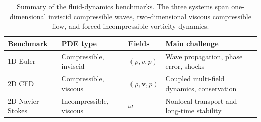 \documentclass[11pt]{article}
\begin{document}
\begin{table}[t]
\small
    \centering
    \caption{
    Summary of the fluid-dynamics benchmarks.
    The three systems span one-dimensional inviscid compressible waves,
    two-dimensional viscous compressible flow, and forced incompressible
    vorticity dynamics.
    }
    \label{tab:benchmark_summary}
    \begin{tabular}{llll}
        \toprule
        Benchmark
        & PDE type
        & Fields
        & Main challenge \\
        \midrule
        1D Euler
        & Compressible, inviscid
        & $(\rho,v,p)$
        & Wave propagation, phase error, shocks \\
        2D CFD
        & Compressible, viscous
        & $(\rho,\mathbf{v},p)$
        & Coupled multi-field dynamics, conservation \\
        2D Navier-Stokes
        & Incompressible, viscous
        & $\omega$
        & Nonlocal transport and long-time stability \\
        \bottomrule
    \end{tabular}
\end{table}
\end{document}
